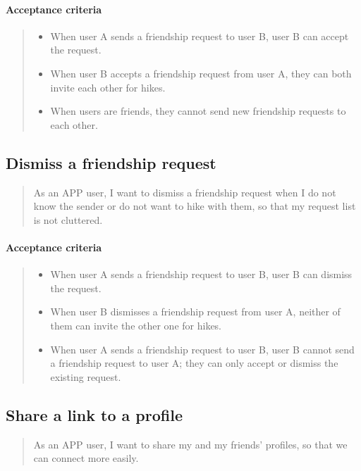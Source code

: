 \paragraph*{Acceptance criteria}
\begin{quote}
\begin{itemize}
    \item When user A sends a friendship request to user B, user B can accept the request.
    \item When user B accepts a friendship request from user A, they can both invite each other for hikes.
    \item When users are friends, they cannot send new friendship requests to each other.
\end{itemize}
\end{quote}


\subsection{Dismiss a friendship request}\label{US:friends-dismiss}
\begin{quote}
As an APP user, I want to dismiss a friendship request when I do not know the sender or do not want to hike with them, so that my request list is not cluttered.
\end{quote}

\paragraph*{Acceptance criteria} 
\begin{quote}
\begin{itemize}
    \item When user A sends a friendship request to user B, user B can dismiss the request.
    \item When user B dismisses a friendship request from user A, neither of them can invite the other one for hikes.
    \item When user A sends a friendship request to user B, user B cannot send a friendship request to user A; they can only accept or dismiss the existing request.
\end{itemize}
\end{quote}

\subsection{Share a link to a profile}\label{US:friends-share}
\begin{quote}
    As an APP user, I want to share my and my friends' profiles, so that we can connect more easily.
\end{quote}

